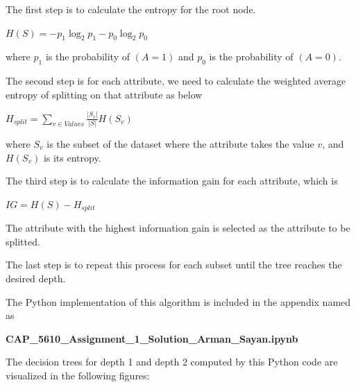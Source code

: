 \documentclass[12pt,letterpaper, onecolumn]{exam}
\begin{document}
\begin{questions}
\begin{parts}
\begin{solution}
        The first step is to calculate the entropy for the root node.

        \begin{center}
            $\displaystyle{H(S) = -p_1 \log_2 p_1 - p_0 \log_2 p_0}$
        \end{center}

        where $p_1$ is the probability of $(A=1)$ 
        and $p_0$ is the probability of $(A=0)$.

        The second step is for each attribute, we need to calculate the 
        weighted average entropy of splitting on that attribute as below

        \begin{center}
            $\displaystyle{H_{split} = \sum_{v \in Values} \frac{|S_v|}{|S|} H(S_v)}$
        \end{center}

        where $S_v$ is the subset of the dataset where the attribute takes 
        the value $v$, and $H(S_v)$ is its entropy.

        The third step is to calculate the information gain for each attribute, which is

        \begin{center}
            $\displaystyle{IG = H(S) - H_{split}}$
        \end{center}

        The attribute with the highest information gain is selected as the attribute to be splitted.

        The last step is to repeat this process for each subset until the tree reaches the desired depth.

        The Python implementation of this algorithm is included in the appendix named as
    
        \begin{center}
            \textbf{CAP\_5610\_Assignment\_1\_Solution\_Arman\_Sayan.ipynb}
        \end{center}

        The decision trees for depth 1 and depth 2 computed by this Python code 
        are visualized in the following figures:
        

\end{solution}
\end{parts}
\end{questions}
\end{document}
